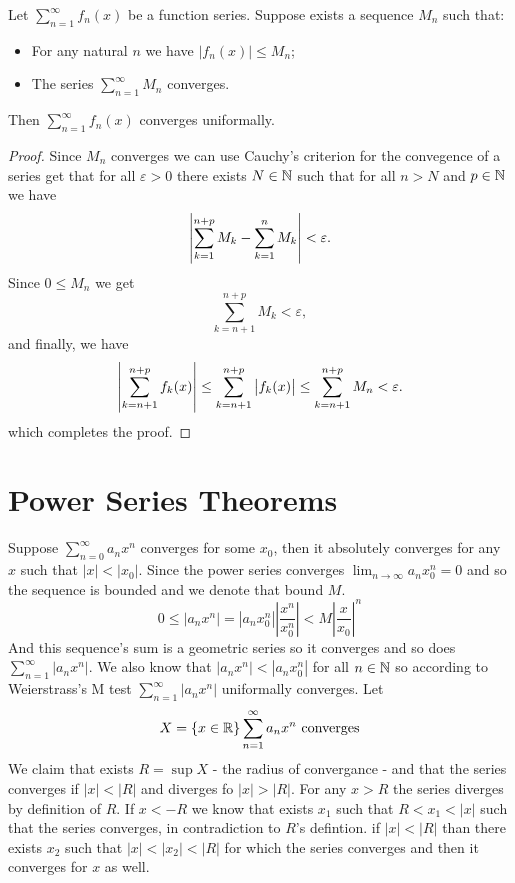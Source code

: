 \documentclass[11pt,a4paper]{article}
\begin{document}
  \begin{proposition}
    Let $\sum_{n=1}^{\infty}{f_n(x)}$ be a function series. 
    Suppose exists a sequence $M_n$ such that:
    \begin{itemize}
        \item For any natural $n$ we have $|f_n(x)| \le M_n$;
        \item The series $\sum_{n=1}^{\infty}{M_n}$ converges.
    \end{itemize}
    Then $\sum_{n=1}^\infty f_n(x)$ converges uniformally.
  \end{proposition}
  \begin{proof}
    Since $M_n$ converges we can use Cauchy's criterion for the convegence 
    of a series get that for all $\varepsilon > 0$ there exists $N \in \mathbb{N}$
    such that for all $n > N$ and $p \in \mathbb{N}$ we have
    \[
      \left\lvert\sum_{k=1}^{n+p} M_k - \sum_{k=1}^{n} M_k\right\rvert < \varepsilon.
    \]
    Since $0 \le M_n$ we get
    \[
      \sum_{k=n+1}^{n+p} M_k < \varepsilon,
    \]
    and finally, we have
    \[
      \left\lvert\sum_{k=n+1}^{n+p} f_k(x)\right\rvert   \le 
      \sum_{k=n+1}^{n+p} \left\lvert f_k(x)\right\rvert \le 
      \sum_{k=n+1}^{n+p} M_n < \varepsilon.
    \]
    which completes the proof.
  \end{proof}
		
	\newpage
	
	\section{Power Series Theorems}
	Suppose $\sum_{n=0}^\infty a_nx^n$ converges for some $x_0$, 
	then it absolutely converges for any $x$ such that $|x|<|x_0|$.
	Since the power series converges $\lim_{n\to\infty}{a_nx_0^n}=0$ 
	and so the sequence is bounded 
	and we denote that bound $M$.
	\[
		0 \le |a_nx^n| 
		= |a_nx_0^n|\left|\frac{x^n}{x_0^n}\right| 
		< M\left|\frac{x}{x_0}\right|^n
	\]
	And this sequence's sum is a geometric series so it converges and so does 
	$\sum_{n=1}^\infty|a_nx^n|$. 
	We also know that $|a_nx^n| < |a_nx_0^n|$ for all $n\in\mathbb{N}$ so according to 
	Weierstrass's M test $\sum_{n=1}^\infty|a_nx^n|$ uniformally converges. 
	Let
	\[
    X = \left\{x \in \mathbb{R}\right\}{\sum_{n=1}^\infty{a_n x^n}\text{ converges}}
	\]
	We claim that exists $R = \sup X$ - the radius of convergance - 
	and that the series converges if $|x|<|R|$ and diverges fo $|x|>|R|$. 
	For any $x>R$ the series diverges by definition of $R$. 
	If $x < -R$ we know that exists $x_1$ such that $R < x_1 < |x|$ such that 
	the series converges, in contradiction to $R$'s defintion. 
	if $|x|<|R|$ than there exists $x_2$ such that $|x|<|x_2|<|R|$ 
	for which the series converges and then it converges for $x$ as well.
	
\end{document}
